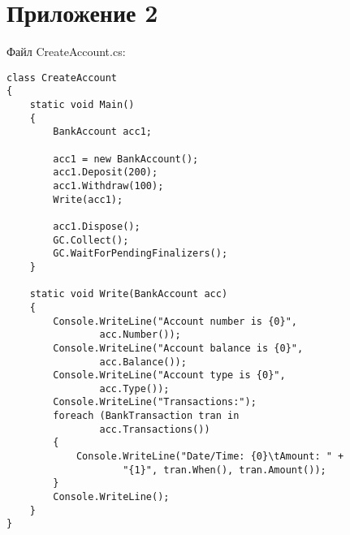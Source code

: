 \chapter*{Приложение 2}

Файл CreateAccount.cs:
\begingroup
\fontsize{12pt}{12pt}\selectfont
\linespread{1.5}
\begin{verbatim}
class CreateAccount
{
    static void Main() 
    {
        BankAccount acc1;

        acc1 = new BankAccount();
        acc1.Deposit(200);
        acc1.Withdraw(100);
        Write(acc1);

        acc1.Dispose();
        GC.Collect();
        GC.WaitForPendingFinalizers();
    }
      
    static void Write(BankAccount acc)
    {
        Console.WriteLine("Account number is {0}",
                acc.Number());
        Console.WriteLine("Account balance is {0}", 
                acc.Balance());
        Console.WriteLine("Account type is {0}",
                acc.Type());
		Console.WriteLine("Transactions:");
		foreach (BankTransaction tran in 
                acc.Transactions()) 
		{
			Console.WriteLine("Date/Time: {0}\tAmount: " +
                    "{1}", tran.When(), tran.Amount());
		}
        Console.WriteLine();
    }
}
\end{verbatim}  
\endgroup

